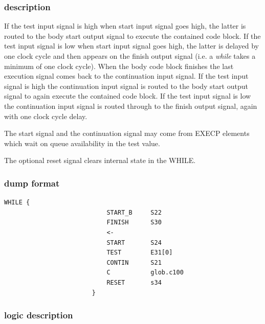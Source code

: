 \documentclass[10pt,a4paper,twoside,fleqn]{book}
\begin{document}
                \subsubsection{description}

                If the test input signal is high when start input signal goes high,
                the latter is routed to the body start output signal to execute the
                contained code block. If the test input signal is low when start
                input signal goes high, the latter is delayed by one clock cycle
                and then appears on the finish output signal (i.e. a {\em while}
                takes a minimum of one clock cycle). When the body code block
                finishes the last execution signal comes back to the continuation
                input signal. If the test input signal is high the continuation
                input signal is routed to the body start output signal to again
                execute the contained code block. If the test input signal is low
                the continuation input signal is routed through to the finish
                output signal, again with one clock cycle delay.

                The start signal and the continuation signal may come from
                EXECP elements which wait on queue availability in the test value.
                
                The optional reset signal clears internal state in the WHILE.

                \subsubsection{dump format}

                    \begin{lstlisting}[gobble=20, language=tde]
                        WHILE {
                            START_B     S22
                            FINISH      S30
                            <-
                            START       S24
                            TEST        E31[0]
                            CONTIN      S21
                            C           glob.c100
                            RESET       s34
                        }
                    \end{lstlisting}

                \subsubsection{logic description}
\end{document}
